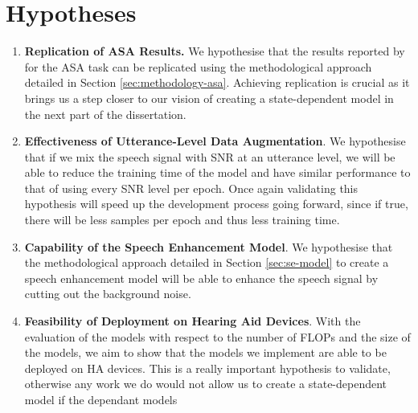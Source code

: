 \documentclass[logo,bsc,singlespacing,parskip,online]{infthesis}
\begin{document}
\section{Hypotheses}
\label{sec:hypotheses}
\begin{enumerate}
   \item \textbf{Replication of ASA Results.} 
   We hypothesise that the results reported by \citet{Huwel2020HearDS} for the ASA task can be replicated using the methodological approach detailed in Section \ref{sec:methodology-asa}.
   Achieving replication is crucial as it brings us a step closer to our vision of creating a state-dependent model in the next part of the dissertation.
   \item \textbf{Effectiveness of Utterance-Level Data Augmentation}. We hypothesise 
   that if we mix the speech signal with SNR at an utterance level, we will be able 
   to reduce the training time of the model and have similar performance to that of using 
   every SNR level per epoch. 
   Once again validating this hypothesis will speed up the development process going forward, 
   since if true, there will be less samples per epoch and thus less training time. 
   \item \textbf{Capability of the Speech Enhancement Model}.
   We hypothesise that the methodological approach detailed in Section \ref{sec:se-model} to 
   create a speech enhancement model will be able to enhance the speech signal by 
   cutting out the background noise. 
   \item \textbf{Feasibility of Deployment on Hearing Aid Devices}.
   With the evaluation of the models with respect to the number of FLOPs and the size of the models,
   we aim to show that the models we implement are able to be deployed on HA devices. 
   This is a really important hypothesis to validate, otherwise any work 
   we do would not allow us to create a state-dependent model if the dependant models 

\end{enumerate}
\end{document}
